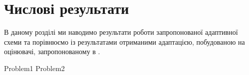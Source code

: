 
\section{Числові результати}

В даному розділі ми наводимо результати роботи запропонованої адаптивної схеми та порівнюємо
	із результатами отриманими адаптацією, побудованою на оцінювачі, запропонованому в \cite{OstShynAee11}.

{Problem1}
{Problem2}
